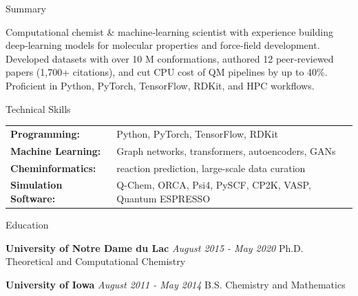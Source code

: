 \documentclass{resume} %
\begin{document}
\begin{rSection}{Summary}

Computational chemist \& machine‑learning scientist with experience building deep‑learning models for molecular properties and force‑field development. Developed datasets with over 10 M conformations, authored 12 peer‑reviewed papers (1,700+ citations), and cut CPU cost of QM pipelines by up to 40\%. Proficient in Python, PyTorch, TensorFlow, RDKit, and HPC workflows.

\end{rSection}


\begin{rSection}{Technical Skills}

\begin{tabular}{ @{} l l @{} }
\textbf{Programming:} & Python, PyTorch, TensorFlow, RDKit \\
\textbf{Machine Learning:} & Graph networks, transformers, autoencoders, GANs \\
\textbf{Cheminformatics:} & reaction prediction, large-scale data curation \\
\textbf{Simulation Software:} & Q-Chem, ORCA, Psi4, PySCF, CP2K, VASP, Quantum ESPRESSO \\
\end{tabular}

\end{rSection}



\begin{rSection}{Education}

{\bf University of Notre Dame du Lac} \hfill {\em August 2015 - May 2020}
\newline Ph.D. Theoretical and Computational Chemistry

{\bf University of Iowa}   \hfill {\em August 2011 - May 2014} 
\newline B.S. Chemistry and Mathematics


\end{rSection}
\end{document}
